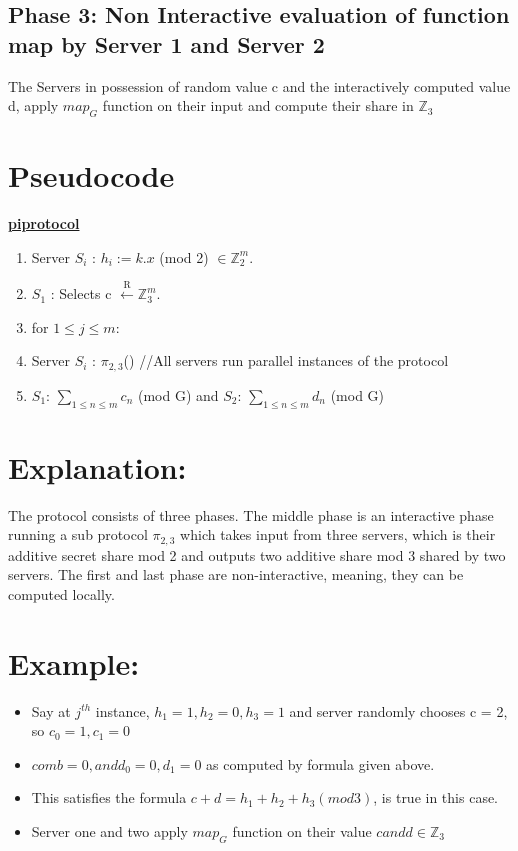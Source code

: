 \documentclass[11pt]{article}
\begin{document}
\subsection{Phase 3: Non Interactive evaluation of function map by Server 1 and Server 2}
The Servers in possession of random value c and the interactively computed value d, apply $map_{G}$ function on their input and compute their share in $\mathbb{Z}_3$

\section{Pseudocode}

\textbf{\underline{piprotocol}}
\begin{enumerate}
	\item Server $S_{i}$ : $h_{i}  := k . x  $ (mod 2) $\in \mathbb{Z}_{2}^{m}$.
	\item $S_{1}$ : Selects c $\xleftarrow{\text{R}} \mathbb{Z}_{3}^{m}$.
	\item for $1 \leq j \leq m$:
	\item \quad Server $S_{i}$ : $\pi_{2,3}$() //All servers run parallel instances of the protocol
	\item $S_{1}$: $\sum_{1 \leq n \leq m} c_{n} $ (mod G) and $S_{2}$: $\sum_{1 \leq n \leq m} d_{n} $ (mod G)
\end{enumerate}
 
\section{Explanation:}

The protocol consists of three phases. The middle phase is an interactive phase running a sub protocol $\pi_{2,3}$ which takes input from three servers, which is their additive secret share mod 2 and outputs two additive share mod 3 shared by two servers. The first and last phase are non-interactive, meaning, they can be computed locally. 


\section{Example:}

\begin{itemize}
	\item Say at $j^{th}$ instance, $h_{1} = 1, h_{2} = 0, h_{3} = 1$ and server randomly chooses c = 2, so $c_{0} = 1, c_{1} = 0$
	\item $comb = 0, and d_{0} = 0, d_{1} = 0$ as computed by formula given above. 
	\item This satisfies the formula $c + d = h_{1} + h_{2} + h_{3} (mod 3)$, is true in this case.
	\item Server one and two apply $map_{G}$ function on their value $c and d \in \mathbb{Z}_3$
	
\end{itemize}
\end{document}
